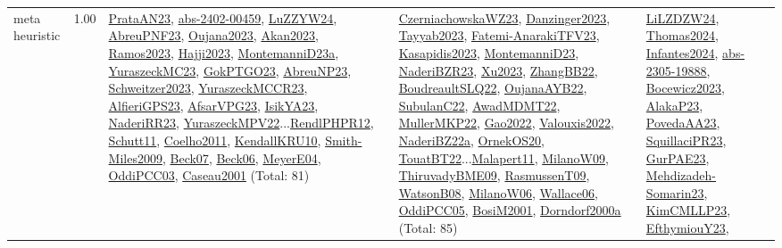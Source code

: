 {\begin{longtable}{p{3cm}r>{\raggedright\arraybackslash}p{6cm}>{\raggedright\arraybackslash}p{6cm}>{\raggedright\arraybackslash}p{8cm}}
\index{meta heuristic}\index{Algorithms!meta heuristic}meta heuristic &  1.00 & \hyperref[detail:PrataAN23]{PrataAN23}, \hyperref[detail:abs-2402-00459]{abs-2402-00459}, \hyperref[detail:LuZZYW24]{LuZZYW24}, \hyperref[detail:AbreuPNF23]{AbreuPNF23}, \hyperref[detail:Oujana2023]{Oujana2023}, \hyperref[detail:Akan2023]{Akan2023}, \hyperref[detail:Ramos2023]{Ramos2023}, \hyperref[detail:Hajji2023]{Hajji2023}, \hyperref[detail:MontemanniD23a]{MontemanniD23a}, \hyperref[detail:YuraszeckMC23]{YuraszeckMC23}, \hyperref[detail:GokPTGO23]{GokPTGO23}, \hyperref[detail:AbreuNP23]{AbreuNP23}, \hyperref[detail:Schweitzer2023]{Schweitzer2023}, \hyperref[detail:YuraszeckMCCR23]{YuraszeckMCCR23}, \hyperref[detail:AlfieriGPS23]{AlfieriGPS23}, \hyperref[detail:AfsarVPG23]{AfsarVPG23}, \hyperref[detail:IsikYA23]{IsikYA23}, \hyperref[detail:NaderiRR23]{NaderiRR23}, \hyperref[detail:YuraszeckMPV22]{YuraszeckMPV22}...\hyperref[detail:RendlPHPR12]{RendlPHPR12}, \hyperref[detail:Schutt11]{Schutt11}, \hyperref[detail:Coelho2011]{Coelho2011}, \hyperref[detail:KendallKRU10]{KendallKRU10}, \hyperref[detail:Smith-Miles2009]{Smith-Miles2009}, \hyperref[detail:Beck07]{Beck07}, \hyperref[detail:Beck06]{Beck06}, \hyperref[detail:MeyerE04]{MeyerE04}, \hyperref[detail:OddiPCC03]{OddiPCC03}, \hyperref[detail:Caseau2001]{Caseau2001} (Total: 81) & \hyperref[detail:CzerniachowskaWZ23]{CzerniachowskaWZ23}, \hyperref[detail:Danzinger2023]{Danzinger2023}, \hyperref[detail:Tayyab2023]{Tayyab2023}, \hyperref[detail:Fatemi-AnarakiTFV23]{Fatemi-AnarakiTFV23}, \hyperref[detail:Kasapidis2023]{Kasapidis2023}, \hyperref[detail:MontemanniD23]{MontemanniD23}, \hyperref[detail:NaderiBZR23]{NaderiBZR23}, \hyperref[detail:Xu2023]{Xu2023}, \hyperref[detail:ZhangBB22]{ZhangBB22}, \hyperref[detail:BoudreaultSLQ22]{BoudreaultSLQ22}, \hyperref[detail:OujanaAYB22]{OujanaAYB22}, \hyperref[detail:SubulanC22]{SubulanC22}, \hyperref[detail:AwadMDMT22]{AwadMDMT22}, \hyperref[detail:MullerMKP22]{MullerMKP22}, \hyperref[detail:Gao2022]{Gao2022}, \hyperref[detail:Valouxis2022]{Valouxis2022}, \hyperref[detail:NaderiBZ22a]{NaderiBZ22a}, \hyperref[detail:OrnekOS20]{OrnekOS20}, \hyperref[detail:TouatBT22]{TouatBT22}...\hyperref[detail:Malapert11]{Malapert11}, \hyperref[detail:MilanoW09]{MilanoW09}, \hyperref[detail:ThiruvadyBME09]{ThiruvadyBME09}, \hyperref[detail:RasmussenT09]{RasmussenT09}, \hyperref[detail:WatsonB08]{WatsonB08}, \hyperref[detail:MilanoW06]{MilanoW06}, \hyperref[detail:Wallace06]{Wallace06}, \hyperref[detail:OddiPCC05]{OddiPCC05}, \hyperref[detail:BosiM2001]{BosiM2001}, \hyperref[detail:Dorndorf2000a]{Dorndorf2000a} (Total: 85) & \hyperref[detail:LiLZDZW24]{LiLZDZW24}, \hyperref[detail:Thomas2024]{Thomas2024}, \hyperref[detail:Infantes2024]{Infantes2024}, \hyperref[detail:abs-2305-19888]{abs-2305-19888}, \hyperref[detail:Bocewicz2023]{Bocewicz2023}, \hyperref[detail:AlakaP23]{AlakaP23}, \hyperref[detail:PovedaAA23]{PovedaAA23}, \hyperref[detail:SquillaciPR23]{SquillaciPR23}, \hyperref[detail:GurPAE23]{GurPAE23}, \hyperref[detail:Mehdizadeh-Somarin23]{Mehdizadeh-Somarin23}, \hyperref[detail:KimCMLLP23]{KimCMLLP23}, \hyperref[detail:EfthymiouY23]{EfthymiouY23}, 
\end{longtable}}
